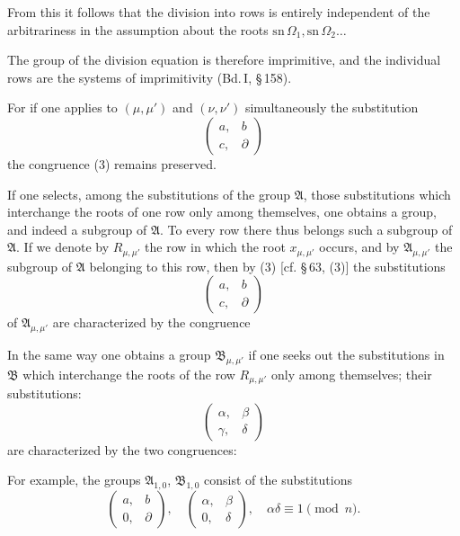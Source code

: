 From this it follows that the division into rows is entirely independent
of the arbitrariness in the assumption about the
roots $\mathrm{sn}\,\Omega_1, \mathrm{sn}\,\Omega_2 \ldots$

The group of the division equation is therefore imprimitive, and the
individual rows are the systems of imprimitivity (Bd.\,I, \S\,158).

For if one applies to $(\mu,\mu')$ and $(\nu,\nu')$ simultaneously the
substitution
\[
\begin{pmatrix} a, & b\\ c, & \partial \end{pmatrix}
\]
the congruence (3) remains preserved.

If one selects, among the substitutions of the group $\mathfrak{A}$, those substitutions
which interchange the roots of one row only among themselves, one obtains a group, and indeed a subgroup
of $\mathfrak{A}$. To every row there thus belongs such a subgroup of $\mathfrak{A}$.
If we denote by $R_{\mu,\mu'}$ the row in which the root $x_{\mu,\mu'}$ occurs,
and by $\mathfrak{A}_{\mu,\mu'}$ the subgroup of $\mathfrak{A}$ belonging to this row,
then by (3) [cf. \S\,63, (3)] the substitutions
\[
\begin{pmatrix} a, & b\\ c, & \partial \end{pmatrix}
\]
of $\mathfrak{A}_{\mu,\mu'}$ are characterized by the congruence


In the same way one obtains a group $\mathfrak{B}_{\mu,\mu'}$ if one seeks out the substitutions
in $\mathfrak{B}$ which interchange the roots of the row $R_{\mu,\mu'}$ only
among themselves; their substitutions:
\[
\begin{pmatrix} \alpha, & \beta\\ \gamma, & \delta \end{pmatrix}
\]
are characterized by the two congruences:


For example, the groups $\mathfrak{A}_{1,0}$, $\mathfrak{B}_{1,0}$ consist of the substitutions
\[
\begin{pmatrix} a, & b\\ 0, & \partial \end{pmatrix}, \quad
\begin{pmatrix} \alpha, & \beta\\ 0, & \delta \end{pmatrix}, \quad \alpha\delta \equiv 1 \pmod{n}.
\]
